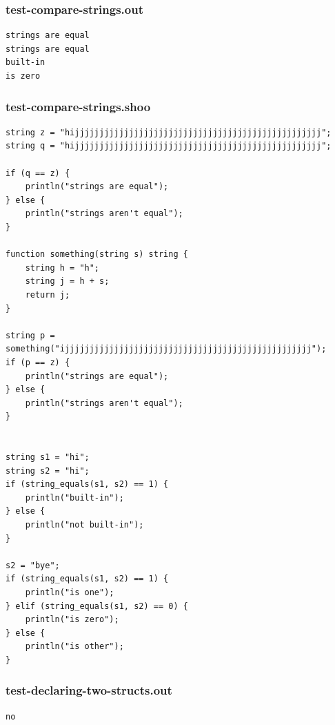 \documentclass[12pt]{article}
\begin{document}
\subsubsection{test-compare-strings.out}
\begin{mdframed}[hidealllines=true,backgroundcolor=green!10]
\begin{lstlisting}
strings are equal
strings are equal
built-in
is zero
\end{lstlisting}
\end{mdframed}
\subsubsection{test-compare-strings.shoo}
\begin{mdframed}[hidealllines=true,backgroundcolor=blue!10]
\begin{lstlisting}
string z = "hijjjjjjjjjjjjjjjjjjjjjjjjjjjjjjjjjjjjjjjjjjjjjjjjjj";
string q = "hijjjjjjjjjjjjjjjjjjjjjjjjjjjjjjjjjjjjjjjjjjjjjjjjjj";

if (q == z) {
    println("strings are equal");
} else {
    println("strings aren't equal");
}

function something(string s) string {
    string h = "h";
    string j = h + s;
    return j;
}

string p = something("ijjjjjjjjjjjjjjjjjjjjjjjjjjjjjjjjjjjjjjjjjjjjjjjjjj");
if (p == z) {
    println("strings are equal");
} else {
    println("strings aren't equal");
} 


string s1 = "hi";
string s2 = "hi";
if (string_equals(s1, s2) == 1) {
    println("built-in");
} else {
    println("not built-in");
}

s2 = "bye";
if (string_equals(s1, s2) == 1) {
    println("is one");
} elif (string_equals(s1, s2) == 0) {
    println("is zero");
} else {
    println("is other");
}

\end{lstlisting}
\end{mdframed}
\subsubsection{test-declaring-two-structs.out}
\begin{mdframed}[hidealllines=true,backgroundcolor=green!10]
\begin{lstlisting}
no
\end{lstlisting}
\end{mdframed}
\end{document}
